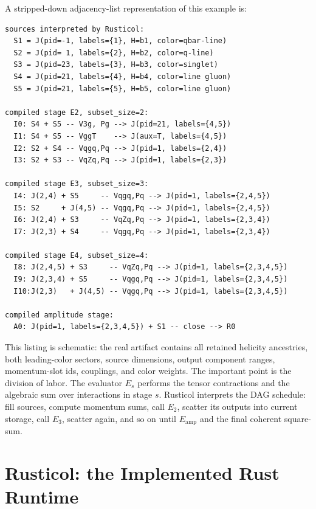 \documentclass[10pt]{article}
\begin{document}
A stripped-down adjacency-list representation of this example is:
\begin{lstlisting}
sources interpreted by Rusticol:
  S1 = J(pid=-1, labels={1}, H=b1, color=qbar-line)
  S2 = J(pid= 1, labels={2}, H=b2, color=q-line)
  S3 = J(pid=23, labels={3}, H=b3, color=singlet)
  S4 = J(pid=21, labels={4}, H=b4, color=line gluon)
  S5 = J(pid=21, labels={5}, H=b5, color=line gluon)

compiled stage E2, subset_size=2:
  I0: S4 + S5 -- V3g, Pg --> J(pid=21, labels={4,5})
  I1: S4 + S5 -- VggT    --> J(aux=T, labels={4,5})
  I2: S2 + S4 -- Vqgq,Pq --> J(pid=1, labels={2,4})
  I3: S2 + S3 -- VqZq,Pq --> J(pid=1, labels={2,3})

compiled stage E3, subset_size=3:
  I4: J(2,4) + S5     -- Vqgq,Pq --> J(pid=1, labels={2,4,5})
  I5: S2     + J(4,5) -- Vqgq,Pq --> J(pid=1, labels={2,4,5})
  I6: J(2,4) + S3     -- VqZq,Pq --> J(pid=1, labels={2,3,4})
  I7: J(2,3) + S4     -- Vqgq,Pq --> J(pid=1, labels={2,3,4})

compiled stage E4, subset_size=4:
  I8: J(2,4,5) + S3     -- VqZq,Pq --> J(pid=1, labels={2,3,4,5})
  I9: J(2,3,4) + S5     -- Vqgq,Pq --> J(pid=1, labels={2,3,4,5})
  I10:J(2,3)   + J(4,5) -- Vqgq,Pq --> J(pid=1, labels={2,3,4,5})

compiled amplitude stage:
  A0: J(pid=1, labels={2,3,4,5}) + S1 -- close --> R0
\end{lstlisting}
This listing is schematic: the real artifact contains all retained helicity
ancestries, both leading-color sectors, source dimensions, output component
ranges, momentum-slot ids, couplings, and color weights.  The important point
is the division of labor.  The evaluator $E_s$ performs the tensor contractions
and the algebraic sum over interactions in stage $s$.  Rusticol interprets the
DAG schedule: fill sources, compute momentum sums, call $E_2$, scatter its
outputs into current storage, call $E_3$, scatter again, and so on until
$E_{\mathrm{amp}}$ and the final coherent square-sum.


\section{Rusticol: the Implemented Rust Runtime}
\end{document}
